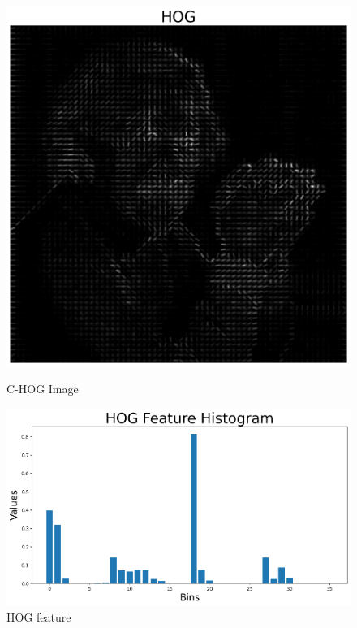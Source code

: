 \begin{figure}[H]
    \centering
    \includegraphics[width=.6\textwidth]{res/chog.png}
    \caption{C-HOG Image}
    \includegraphics[width=.9\textwidth]{res/hog_feature.png}
    \caption{HOG feature}
    \label{fig:1.4}
\end{figure}